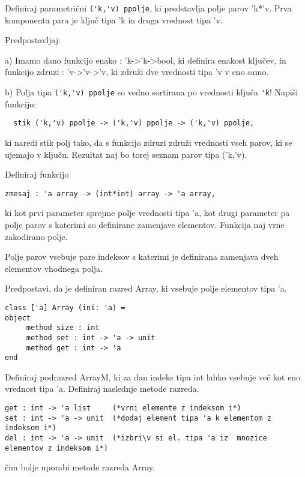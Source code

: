 \begin{ex}
  Definiraj parametri\v cni \lstinline{('k,'v) ppolje}, ki predstavlja
  polje parov 'k*'v. Prva komponenta para je klju\v c tipa 'k in druga
  vrednost tipa 'v.

  \noindent\/Predpostavljaj:

  a) Imamo dano funkcijo enako : 'k->'k->bool, ki definira enakost
  klju\v cev, in funkcijo zdruzi : 'v->'v->'v, ki zdru\v zi dve
  vrednosti tipa 'v v eno samo.

  b) Polja tipa \lstinline{('k,'v) ppolje} so vedno sortirana po vrednosti klju\v
  ca \lstinline{'k}!  Napi\v si funkcijo:
\begin{lstlisting}
  stik ('k,'v) ppolje -> ('k,'v) ppolje -> ('k,'v) ppolje,
\end{lstlisting}
  ki naredi stik polj tako, da s funkcijo zdruzi zdru\v zi vrednosti
  vseh parov, ki se ujemajo v klju\v cu. Rezultat naj bo torej seznam
  parov tipa ('k,'v).
\end{ex}




\begin{ex}
Definiraj funkcijo 
\begin{lstlisting}
zmesaj : 'a array -> (int*int) array -> 'a array, 
\end{lstlisting}
ki kot prvi parameter sprejme polje vrednosti tipa 'a, kot drugi parameter pa polje parov s katerimi so definirane zamenjave elementov. Funkcija naj vrne zakodirano polje. 

Polje parov vsebuje pare indeksov s katerimi je definirana zamenjava dveh elementov vhodnega polja. 
\end{ex} 




\begin{ex}
Predpostavi, da je definiran razred Array, ki vsebuje polje elementov tipa 'a. 

\begin{lstlisting}
class ['a] Array (ini: 'a) =
object 
     method size : int
     method set : int -> 'a -> unit
     method get : int -> 'a
end
\end{lstlisting}
Definiraj podrazred ArrayM, ki za dan indeks tipa int lahko vsebuje ve\v c kot eno vrednost tipa 'a.  Definiraj naslednje metode razreda. 
\begin{lstlisting}
get : int -> 'a list     (*vrni elemente z indeksom i*) 
set : int -> 'a -> unit  (*dodaj element tipa 'a k elementom z indeksom i*)
del : int -> 'a -> unit  (*izbri\v si el. tipa 'a iz  mnozice elementov z indeksom i*)
\end{lstlisting}
\v cim bolje uporabi metode razreda Array. 
\end{ex} 





